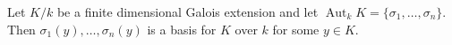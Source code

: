 Let $K/k$ be a finite dimensional Galois extension and let $\operatorname{Aut}_k K = \{\sigma_1, \ldots, \sigma_n\}$. Then $\sigma_1(y), \ldots, \sigma_n(y)$ is a basis for $K$ over $k$ for some $y \in K$.
